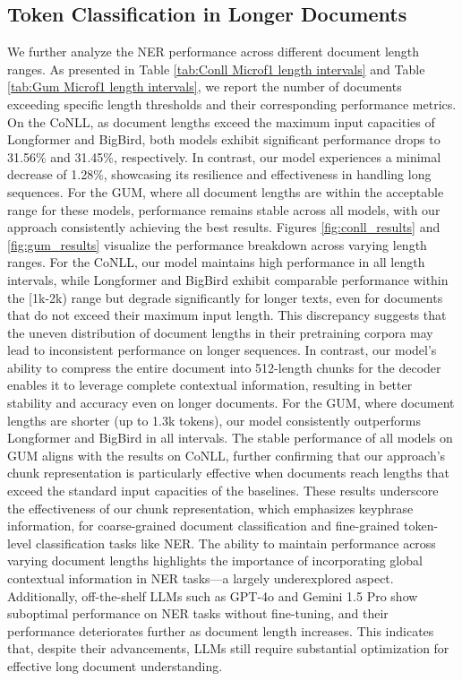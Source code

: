 \documentclass[11pt]{article}
\begin{document}
\subsection{Token Classification in Longer Documents}
We further analyze the NER performance across different document length ranges. As presented in Table \ref{tab:Conll Microf1 length intervals} and Table \ref{tab:Gum Microf1 length intervals}, we report the number of documents exceeding specific length thresholds and their corresponding performance metrics. On the CoNLL, as document lengths exceed the maximum input capacities of Longformer and BigBird, both models exhibit significant performance drops to 31.56\% and 31.45\%, respectively. In contrast, our model experiences a minimal decrease of 1.28\%, showcasing its resilience and effectiveness in handling long sequences. For the GUM, where all document lengths are within the acceptable range for these models, performance remains stable across all models, with our approach consistently achieving the best results.
Figures \ref{fig:conll_results} and \ref{fig:gum_results} visualize the performance breakdown across varying length ranges. For the CoNLL, our model maintains high performance in all length intervals, while Longformer and BigBird exhibit comparable performance within the [1k-2k) range but degrade significantly for longer texts, even for documents that do not exceed their maximum input length. This discrepancy suggests that the uneven distribution of document lengths in their pretraining corpora may lead to inconsistent performance on longer sequences. In contrast, our model’s ability to compress the entire document into 512-length chunks for the decoder enables it to leverage complete contextual information, resulting in better stability and accuracy even on longer documents.
For the GUM, where document lengths are shorter (up to 1.3k tokens), our model consistently outperforms Longformer and BigBird in all intervals. The stable performance of all models on GUM aligns with the results on CoNLL, further confirming that our approach’s chunk representation is particularly effective when documents reach lengths that exceed the standard input capacities of the baselines.
These results underscore the effectiveness of our chunk representation, which emphasizes keyphrase information, for coarse-grained document classification and fine-grained token-level classification tasks like NER. The ability to maintain performance across varying document lengths highlights the importance of incorporating global contextual information in NER tasks—a largely underexplored aspect. Additionally, off-the-shelf LLMs such as GPT-4o and Gemini 1.5 Pro show suboptimal performance on NER tasks without fine-tuning, and their performance deteriorates further as document length increases. This indicates that, despite their advancements, LLMs still require substantial optimization for effective long document understanding.
\end{document}

